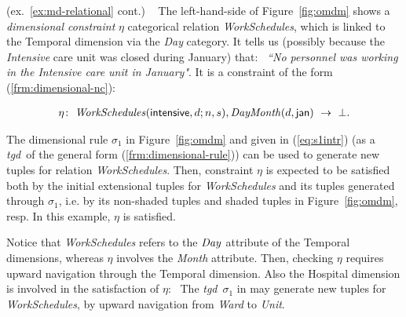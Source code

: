 \documentclass[format=acmsmall, review=false, screen=true]{acmart}
\newcommand{\ignore}[1]{}
\newcommand{\mc}[1]{\mathcal{ #1}}
\newcommand{\nit}[1]{{\it #1}}
\newcommand{\bl}[1]{#1}
\newcommand{\tgd}{{\em tgd}}
\begin{document}
\ignore{(\ref{if there is a single child-parent predicate $P_j \in \mc{L}$ in the body of (\ref{frm:dimensional-rule}), and the join is between $R_i(\bar{x}_i;\bar{y}_i)$ and $P_j(x_j,x'_j)$ (via a categorical variable in $\bar{x}_i$), then {\em one-step upward-navigation} is enabled, from $x'_j$ to $x_j$, when $x'_j \in \bar{x}_i$ (i.e. $x'_j$ appears in $R_i(\bar{x}_i;\bar{y}_i)$) and $x_j \in \bar{x}'$, i.e in the head). An example is $\sigma_1$ in (\ref{eq:s1intr}). \  {\em One-step downward-navigation} is enabled,  from $x_j$ to $x'_j$, when $x_j$ occurs in $R_i$ and $x'_j$ occurs in $R_k$.} }


\begin{example} \bl{(ex.~\ref{ex:md-relational} cont.)} \ \label{ex:ont} The left-hand-side of Figure~\ref{fig:omdm} shows a  {\em dimensional constraint} $\eta$
categorical relation  {\it WorkSchedules}, which is  linked to  the {\sf Temporal} dimension via the {\it Day} category. It tells us (possibly because the {\it Intensive} care unit was closed during January) that: \ {\em ``No personnel was working in the Intensive care unit in January"}. It is a constraint of the form (\ref{frm:dimensional-nc}):

\vspace{-4mm}
\begin{align}
\eta\!: \ \nit{WorkSchedules}({\sf intensive},d;n,s),\nit{DayMonth}(d,{\sf jan})  ~\rightarrow~ \bot.\label{frm:expnc}
\end{align}
\vspace{-4mm}

The dimensional rule  $\sigma_1$ in Figure~\ref{fig:omdm} and given in (\ref{eq:s1intr}) (as a \tgd \ of the general form (\ref{frm:dimensional-rule})) can be used to generate new tuples for relation {\it WorkSchedules}. Then, constraint $\eta$ is expected to be satisfied both by the initial extensional tuples for {\it WorkSchedules} and its tuples generated through $\sigma_1$, i.e. by its non-shaded tuples and shaded tuples in Figure~\ref{fig:omdm}, resp.
In this example, $\eta$ is satisfied.

Notice that {\it WorkSchedules} refers to the $\nit{Day}$ attribute of the {\sf Temporal} dimensions, whereas $\eta$ involves the \nit{Month} attribute. Then, checking $\eta$ requires upward navigation through the {\sf Temporal} dimension.  Also the {\sf Hospital} dimension  is involved in the satisfaction of $\eta$: \ The \tgd \ $\sigma_1$ in  may generate new tuples for {\it WorkSchedules}, by upward navigation from {\it Ward} to {\it Unit}.


\end{example}
\end{document}
